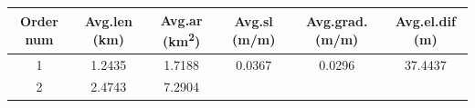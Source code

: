 \documentclass[11pt,]{article}
\begin{document}
\begin{longtable}[]{@{}cccccc@{}}
\toprule
\begin{minipage}[b]{0.08\columnwidth}\centering\strut
Order num\strut
\end{minipage} & \begin{minipage}[b]{0.11\columnwidth}\centering\strut
Avg.len (km)\strut
\end{minipage} & \begin{minipage}[b]{0.25\columnwidth}\centering\strut
Avg.ar (km\textsuperscript{2})\strut
\end{minipage} & \begin{minipage}[b]{0.11\columnwidth}\centering\strut
Avg.sl (m/m)\strut
\end{minipage} & \begin{minipage}[b]{0.14\columnwidth}\centering\strut
Avg.grad. (m/m)\strut
\end{minipage} & \begin{minipage}[b]{0.13\columnwidth}\centering\strut
Avg.el.dif (m)\strut
\end{minipage}\tabularnewline
\midrule
\endhead
\begin{minipage}[t]{0.08\columnwidth}\centering\strut
1\strut
\end{minipage} & \begin{minipage}[t]{0.11\columnwidth}\centering\strut
1.2435\strut
\end{minipage} & \begin{minipage}[t]{0.25\columnwidth}\centering\strut
1.7188\strut
\end{minipage} & \begin{minipage}[t]{0.11\columnwidth}\centering\strut
0.0367\strut
\end{minipage} & \begin{minipage}[t]{0.14\columnwidth}\centering\strut
0.0296\strut
\end{minipage} & \begin{minipage}[t]{0.13\columnwidth}\centering\strut
37.4437\strut
\end{minipage}\tabularnewline
\begin{minipage}[t]{0.08\columnwidth}\centering\strut
2\strut
\end{minipage} & \begin{minipage}[t]{0.11\columnwidth}\centering\strut
2.4743\strut
\end{minipage} & \begin{minipage}[t]{0.25\columnwidth}\centering\strut
7.2904\strut
\end{minipage} & \begin{minipage}[t]{0.11\columnwidth}\centering\strut

\end{minipage}
\end{longtable}
\end{document}
